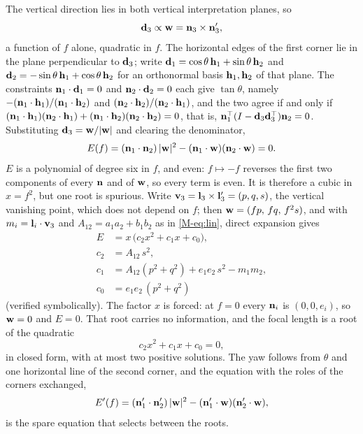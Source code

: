 The vertical direction lies in both vertical interpretation planes, so
\begin{equation}
\mathbf{d}_3\propto\mathbf{w}=\mathbf{n}_3\times\mathbf{n}_3',
\end{equation}
a function of $f$ alone, quadratic in $f$. The horizontal edges of the first corner lie in the plane perpendicular to $\mathbf{d}_3$; write $\mathbf{d}_1=\cos\theta\,\mathbf{h}_1+\sin\theta\,\mathbf{h}_2$ and $\mathbf{d}_2=-\sin\theta\,\mathbf{h}_1+\cos\theta\,\mathbf{h}_2$ for an orthonormal basis $\mathbf{h}_1,\mathbf{h}_2$ of that plane. The constraints $\mathbf{n}_1\cdot\mathbf{d}_1=0$ and $\mathbf{n}_2\cdot\mathbf{d}_2=0$ each give $\tan\theta$, namely $-(\mathbf{n}_1\cdot\mathbf{h}_1)/(\mathbf{n}_1\cdot\mathbf{h}_2)$ and $(\mathbf{n}_2\cdot\mathbf{h}_2)/(\mathbf{n}_2\cdot\mathbf{h}_1)$, and the two agree if and only if $(\mathbf{n}_1\cdot\mathbf{h}_1)(\mathbf{n}_2\cdot\mathbf{h}_1)+(\mathbf{n}_1\cdot\mathbf{h}_2)(\mathbf{n}_2\cdot\mathbf{h}_2)=0$, that is, $\mathbf{n}_1^{\top}(I-\mathbf{d}_3\mathbf{d}_3^{\top})\mathbf{n}_2=0$. Substituting $\mathbf{d}_3=\mathbf{w}/|\mathbf{w}|$ and clearing the denominator,
\begin{equation}
E(f)=(\mathbf{n}_1\cdot\mathbf{n}_2)\,|\mathbf{w}|^2-(\mathbf{n}_1\cdot\mathbf{w})(\mathbf{n}_2\cdot\mathbf{w})=0 .
\label{eq:E}
\end{equation}
$E$ is a polynomial of degree six in $f$, and even: $f\mapsto-f$ reverses the first two components of every $\mathbf{n}$ and of $\mathbf{w}$, so every term is even. It is therefore a cubic in $x=f^2$, but one root is spurious. Write $\mathbf{v}_3=\mathbf{l}_3\times\mathbf{l}_3'=(p,q,s)$, the vertical vanishing point, which does not depend on $f$; then $\mathbf{w}=(fp,\,fq,\,f^2s)$, and with $m_i=\mathbf{l}_i\cdot\mathbf{v}_3$ and $A_{12}=a_1a_2+b_1b_2$ as in \eqref{M-eq:lin}, direct expansion gives
\begin{equation}
\begin{aligned}
E&=x\,\bigl(c_2x^2+c_1x+c_0\bigr),\\
c_2&=A_{12}\,s^2,\\
c_1&=A_{12}(p^2+q^2)+e_1e_2\,s^2-m_1m_2,\\
c_0&=e_1e_2\,(p^2+q^2)
\end{aligned}
\label{eq:coeffs}
\end{equation}
(verified symbolically). The factor $x$ is forced: at $f=0$ every $\mathbf{n}_i$ is $(0,0,e_i)$, so $\mathbf{w}=0$ and $E=0$. That root carries no information, and the focal length is a root of the quadratic
\begin{equation}
c_2x^2+c_1x+c_0=0,
\label{eq:quadratic}
\end{equation}
in closed form, with at most two positive solutions. The yaw follows from $\theta$ and one horizontal line of the second corner, and the equation with the roles of the corners exchanged,
\begin{equation}
E'(f)=(\mathbf{n}_1'\cdot\mathbf{n}_2')\,|\mathbf{w}|^2-(\mathbf{n}_1'\cdot\mathbf{w})(\mathbf{n}_2'\cdot\mathbf{w}),
\end{equation}
is the spare equation that selects between the roots.

